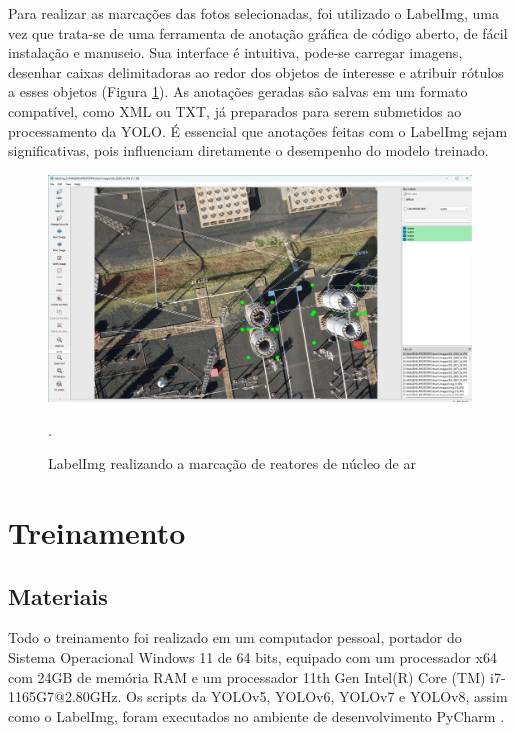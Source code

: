 Para realizar as marcações das fotos selecionadas, foi utilizado o LabelImg, uma vez que trata-se de uma ferramenta de anotação gráfica de código aberto, de fácil instalação e manuseio. Sua interface é intuitiva, pode-se carregar imagens, desenhar caixas delimitadoras ao redor dos objetos de interesse e atribuir rótulos a esses objetos (Figura \ref{fig:reator-marcado}). As anotações geradas são salvas em um formato compatível, como XML ou TXT, já preparados para serem submetidos ao processamento da YOLO. É essencial que anotações feitas com o LabelImg sejam significativas, pois influenciam diretamente o desempenho do modelo treinado.

\begin{figure}[!h]
    \centering
    \begin{minipage}{1\linewidth}
    \centering
    \captionsetup{justification=centering,margin=0.5cm,font=small}
    \includegraphics[width=1\linewidth]{img/cap4/marcacao.jpeg}
    \caption{LabelImg realizando a marcação de reatores de núcleo de ar}.
    \label{fig:reator-marcado}
    \end{minipage}
\end{figure}

\section{Treinamento}

\subsection{Materiais}

Todo o treinamento foi realizado em um computador pessoal, portador do Sistema Operacional Windows 11 de 64 bits, equipado com um processador x64 com 24GB de memória RAM e um processador 11th Gen Intel(R) Core (TM) i7-1165G7@2.80GHz. Os scripts da YOLOv5, YOLOv6, YOLOv7 e YOLOv8, assim como o LabelImg, foram executados no ambiente de desenvolvimento PyCharm \cite{pycharm}.

